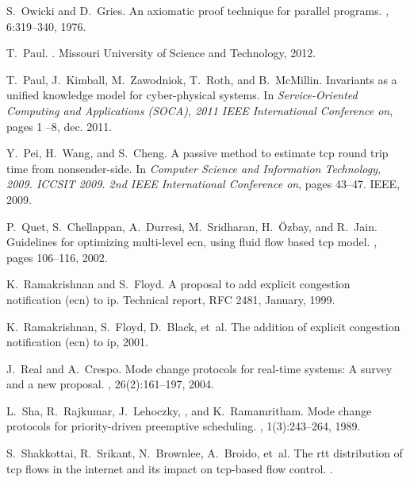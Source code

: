 \documentclass{sig-alternate-ipsn13}
\begin{document}
\begin{thebibliography}{10}
S.~Owicki and D.~Gries.
\newblock An axiomatic proof technique for parallel programs.
, 6:319--340, 1976.

T.~Paul.
.
\newblock Missouri University of Science and Technology, 2012.

T.~Paul, J.~Kimball, M.~Zawodniok, T.~Roth, and B.~McMillin.
\newblock Invariants as a unified knowledge model for cyber-physical systems.
\newblock In {\em Service-Oriented Computing and Applications (SOCA), 2011 IEEE
  International Conference on}, pages 1 --8, dec. 2011.



Y.~Pei, H.~Wang, and S.~Cheng.
\newblock A passive method to estimate tcp round trip time from nonsender-side.
\newblock In {\em Computer Science and Information Technology, 2009. ICCSIT
  2009. 2nd IEEE International Conference on}, pages 43--47. IEEE, 2009.



P.~Quet, S.~Chellappan, A.~Durresi, M.~Sridharan, H.~{\"O}zbay, and R.~Jain.
\newblock Guidelines for optimizing multi-level ecn, using fluid flow based tcp
  model.
, pages 106--116, 2002.


K.~Ramakrishnan and S.~Floyd.
\newblock A proposal to add explicit congestion notification (ecn) to ip.
\newblock Technical report, RFC 2481, January, 1999.

K.~Ramakrishnan, S.~Floyd, D.~Black, et~al.
\newblock The addition of explicit congestion notification (ecn) to ip, 2001.

J.~Real and A.~Crespo.
\newblock Mode change protocols for real-time systems: A survey and a new
  proposal.
, 26(2):161--197, 2004.

L.~Sha, R.~Rajkumar, J.~Lehoczky, , and K.~Ramamritham.
\newblock Mode change protocols for priority-driven preemptive scheduling.
, 1(3):243--264, 1989.

S.~Shakkottai, R.~Srikant, N.~Brownlee, A.~Broido, et~al.
\newblock The rtt distribution of tcp flows in the internet and its impact on
  tcp-based flow control.
.


\end{thebibliography}
\end{document}
